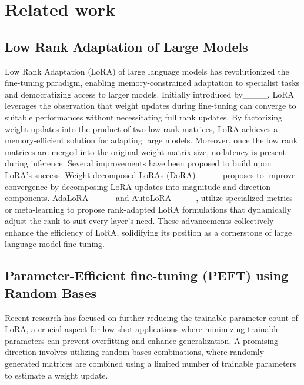 \section{Related work\label{sec:related}
}

\subsection{Low Rank Adaptation of Large Models}

Low Rank Adaptation (LoRA) of large language models has revolutionized the fine-tuning paradigm, enabling memory-constrained adaptation to specialist tasks and democratizing access to larger models. Initially introduced by____, LoRA leverages the observation that weight updates during fine-tuning can converge to suitable performances without necessitating full rank updates. By factorizing weight updates into the product of two low rank matrices, LoRA achieves a memory-efficient solution for adapting large models. Moreover, once the low rank matrices are merged into the original weight matrix size, no latency is present during inference.
Several improvements have been proposed to build upon LoRA's success. Weight-decomposed LoRAs (DoRA)____ proposes to improve convergence by decomposing LoRA updates into magnitude and direction components. AdaLoRA____ and AutoLoRA____, utilize specialized metrics or meta-learning to propose rank-adapted LoRA formulations that dynamically adjust the rank to suit every layer's need. 
These advancements collectively enhance the efficiency of LoRA, solidifying its position as a cornerstone of large language model fine-tuning.

\subsection{Parameter-Efficient fine-tuning (PEFT) using Random Bases}
Recent research has focused on further reducing the trainable parameter count of LoRA, a crucial aspect for low-shot applications where minimizing trainable parameters can prevent overfitting and enhance generalization. A promising direction involves utilizing random bases combinations, where randomly generated matrices are combined using a limited number of trainable parameters to estimate a weight update.


